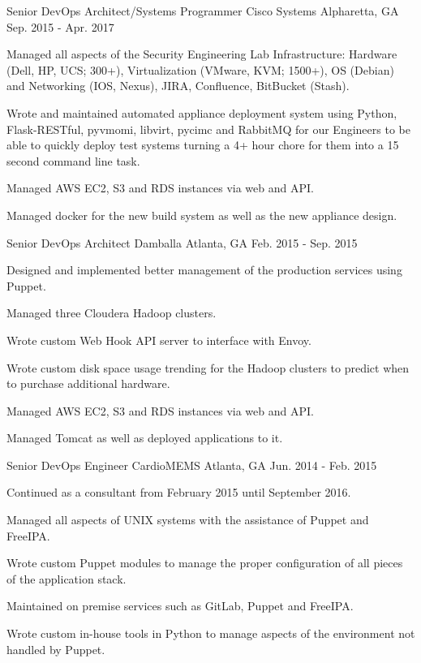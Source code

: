 \begin{cventries}
\cventry
{Senior DevOps Architect/Systems Programmer}
{Cisco Systems}
{Alpharetta, GA}
{Sep. 2015 - Apr. 2017}
{
\begin{cvitems}
\item {Managed all aspects of the Security Engineering Lab Infrastructure: Hardware (Dell, HP, UCS; 300+), Virtualization (VMware, KVM; 1500+), OS (Debian) and Networking (IOS, Nexus), JIRA, Confluence, BitBucket (Stash).}
\item {Wrote and maintained automated appliance deployment system using Python, Flask-RESTful, pyvmomi, libvirt, pycimc and RabbitMQ for our Engineers to be able to quickly deploy test systems turning a 4+ hour chore for them into a 15 second command line task.}
\item {Managed AWS EC2, S3 and RDS instances via web and API.}
\item {Managed docker for the new build system as well as the new appliance design.}
\end{cvitems}
}

\cventry
{Senior DevOps Architect}
{Damballa}
{Atlanta, GA}
{Feb. 2015 - Sep. 2015}
{
\begin{cvitems}
\item {Designed and implemented better management of the production services using Puppet.}
\item {Managed three Cloudera Hadoop clusters.}
\item {Wrote custom Web Hook API server to interface with Envoy.}
\item {Wrote custom disk space usage trending for the Hadoop clusters to predict when to purchase additional hardware.}
\item {Managed AWS EC2, S3 and RDS instances via web and API.}
\item {Managed Tomcat as well as deployed applications to it.}
\end{cvitems}
}

\cventry
{Senior DevOps Engineer}
{CardioMEMS}
{Atlanta, GA}
{Jun. 2014 - Feb. 2015}
{
\begin{cvitems}
\item {Continued as a consultant from February 2015 until September 2016.}
\item {Managed all aspects of UNIX systems with the assistance of Puppet and FreeIPA.}
\item {Wrote custom Puppet modules to manage the proper configuration of all pieces of the application stack.}
\item {Maintained on premise services such as GitLab, Puppet and FreeIPA.}
\item {Wrote custom in-house tools in Python to manage aspects of the environment not handled by Puppet.}
\end{cvitems}
}


\end{cventries}
